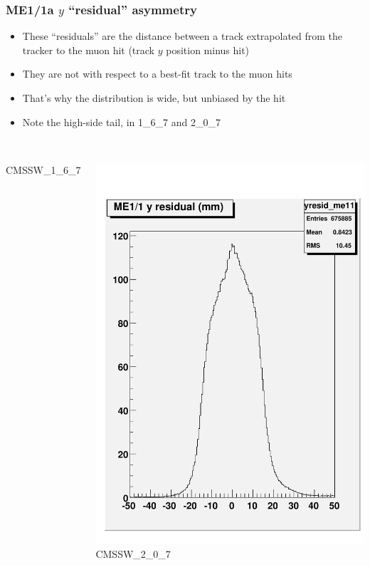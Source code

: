 \documentclass[compress]{beamer}
\begin{document}
\begin{frame}
\frametitle{ME1/1a $y$ ``residual'' asymmetry}
\small
\begin{itemize}
\item These ``residuals'' are the distance between a track extrapolated from the tracker to the muon hit (track $y$ position minus hit)
\item They are not with respect to a best-fit track to the muon hits
\item That's why the distribution is wide, but unbiased by the hit
\item Note the high-side tail, in 1\_6\_7 and 2\_0\_7
\end{itemize}

\begin{columns}
\mbox{ } \hfill CMSSW\_1\_6\_7

\mbox{ } \hfill \includegraphics[width=0.7\linewidth]{talk_me11_yresid_167.pdf}
CMSSW\_2\_0\_7


\end{columns}
\end{frame}
\end{document}
